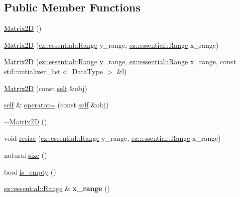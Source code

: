 \subsection*{Public Member Functions}
\begin{DoxyCompactItemize}
\item 
\hyperlink{classez_1_1objects_1_1Matrix2D_a1984c0e18d3921f89edc9f255c7eef70}{Matrix2D} ()
\item 
\hyperlink{classez_1_1objects_1_1Matrix2D_ac3bd803c3d42ae0eeb0bc50d04148d7f}{Matrix2D} (\hyperlink{classez_1_1essential_1_1Range}{ez\+::essential\+::\+Range} y\+\_\+range, \hyperlink{classez_1_1essential_1_1Range}{ez\+::essential\+::\+Range} x\+\_\+range)
\item 
\hyperlink{classez_1_1objects_1_1Matrix2D_aa8e3f8149bc97efb0a2c45c10520594b}{Matrix2D} (\hyperlink{classez_1_1essential_1_1Range}{ez\+::essential\+::\+Range} y\+\_\+range, \hyperlink{classez_1_1essential_1_1Range}{ez\+::essential\+::\+Range} x\+\_\+range, const std\+::initializer\+\_\+list$<$ Data\+Type $>$ \&l)
\item 
\hyperlink{classez_1_1objects_1_1Matrix2D_aeebbde5d2059f7e190759dfc0412f353}{Matrix2D} (const \hyperlink{classez_1_1objects_1_1Matrix2D}{self} \&obj)
\item 
\hyperlink{classez_1_1objects_1_1Matrix2D}{self} \& \hyperlink{classez_1_1objects_1_1Matrix2D_a693a0c5feb9dd40f8a3f72abc7680f46}{operator=} (const \hyperlink{classez_1_1objects_1_1Matrix2D}{self} \&obj)
\item 
\hyperlink{classez_1_1objects_1_1Matrix2D_a3de573bc8beb0160ebb6bdfa7bf4daa2}{$\sim$\+Matrix2D} ()
\item 
void \hyperlink{classez_1_1objects_1_1Matrix2D_a14783b5e865959b2aa6d1b19ec705b37}{resize} (\hyperlink{classez_1_1essential_1_1Range}{ez\+::essential\+::\+Range} y\+\_\+range, \hyperlink{classez_1_1essential_1_1Range}{ez\+::essential\+::\+Range} x\+\_\+range)
\item 
natural \hyperlink{classez_1_1objects_1_1Matrix2D_a236462257912521cf98d8b5899f228f2}{size} ()
\item 
bool \hyperlink{classez_1_1objects_1_1Matrix2D_acab487d980231c63d1ea4dd6de734b2f}{is\+\_\+empty} ()
\item 
\mbox{\label{classez_1_1objects_1_1Matrix2D_a3346b8cb727a77de4d6f21d7f1c8d828}} 
\hyperlink{classez_1_1essential_1_1Range}{ez\+::essential\+::\+Range} \& {\bfseries x\+\_\+range} ()
\item 

\end{DoxyCompactItemize}
